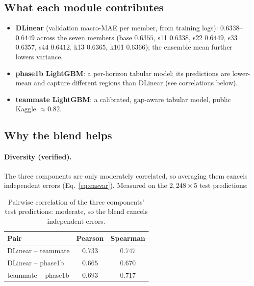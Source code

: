 \documentclass[11pt]{article}
\begin{document}
\subsection{What each module contributes}
\begin{itemize}
  \item \textbf{DLinear} (validation macro-MAE per member, from training logs):
        $0.6338$--$0.6449$ across the seven members
        (base $0.6355$, s11 $0.6338$, s22 $0.6449$, s33 $0.6357$, s44 $0.6412$, k13 $0.6365$,
        k101 $0.6366$); the ensemble mean further lowers variance.
  \item \textbf{phase1b LightGBM}: a per-horizon tabular model; its predictions are lower-mean and
        capture different regions than DLinear (see correlations below).
  \item \textbf{teammate LightGBM}: a calibrated, gap-aware tabular model, public Kaggle $\approx0.82$.
\end{itemize}

\subsection{Why the blend helps}
\paragraph{Diversity (verified).} The three components are only moderately correlated, so averaging
them cancels independent errors (Eq.~\ref{eq:ensvar}). Measured on the $2{,}248\times5$ test
predictions:
\begin{table}[h]
\centering
\begin{tabular}{lcc}
\toprule
Pair & Pearson & Spearman \\
\midrule
DLinear -- teammate & $0.733$ & $0.747$ \\
DLinear -- phase1b  & $0.665$ & $0.670$ \\
teammate -- phase1b & $0.693$ & $0.717$ \\
\bottomrule
\end{tabular}
\caption{Pairwise correlation of the three components' test predictions: moderate, so the blend
cancels independent errors.}
\label{tab:corr}
\end{table}
\end{document}
